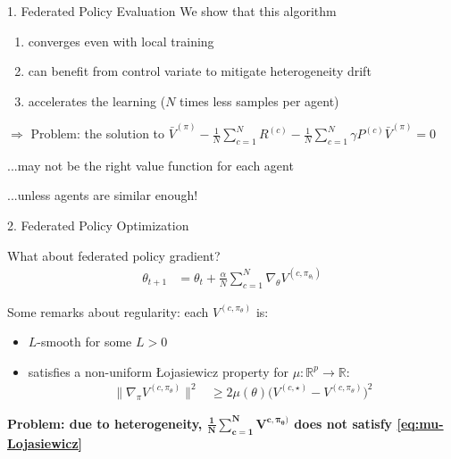 \documentclass[12pt,aspectratio=169]{beamer}
\begin{document}
\begin{frame}{1. Federated Policy Evaluation}
  We show that this algorithm
  \begin{enumerate}
  \item converges even with local training
  \item can benefit from control variate to mitigate heterogeneity drift
  \item accelerates the learning ($N$ times less samples per agent)
  \end{enumerate}

  \textcolor{amaranth}{$\boldsymbol{\Rightarrow}$ Problem:} the solution to $ 
    \bar{V}^{(\pi)}
    - \frac{1}{N} \sum_{c=1}^N R^{(c)} - \frac{1}{N} \sum_{c=1}^N \gamma P^{(c)} \bar{V}^{(\pi)}   = 0$

  \hspace{4em} ...may not be the right value function for each agent

  \hspace{4em} ...unless agents are similar enough!
\end{frame}


\begin{frame}{2. Federated Policy Optimization}

  \pause
  
  What about federated policy gradient?
  \begin{align*}
    \theta_{t+1}
    & =
      \theta_t
      + \frac{\alpha}{N} \sum_{c=1}^N \nabla_\theta V^{(c,\pi_{\theta_t})}
  \end{align*}

  \pause

  Some remarks about regularity: each $V^{(c,\pi_\theta)}$ is:
  \begin{itemize}
  \item $L$-smooth for some $L > 0$
  \item satisfies a non-uniform Łojasiewicz property for $\mu : \mathbb{R}^p \rightarrow \mathbb{R}$:
    \begin{align}
      \label{eq:mu-Lojasiewicz} \tag{$\star$}
      \lVert \nabla_\pi V^{(c, \pi_\theta)} \rVert^2
      & \ge
        2 \mu(\theta) \big( V^{(c, \star)} - V^{(c, \pi_\theta)})^2
    \end{align}
  \end{itemize}

  \textbf{\textcolor{amaranth}{Problem: due to heterogeneity, $\boldsymbol{\frac{1}{N} \sum_{c=1}^N V^{c,\pi_\theta)}}$ does not satisfy \eqref{eq:mu-Lojasiewicz} }}
  
\end{frame}
\end{document}
